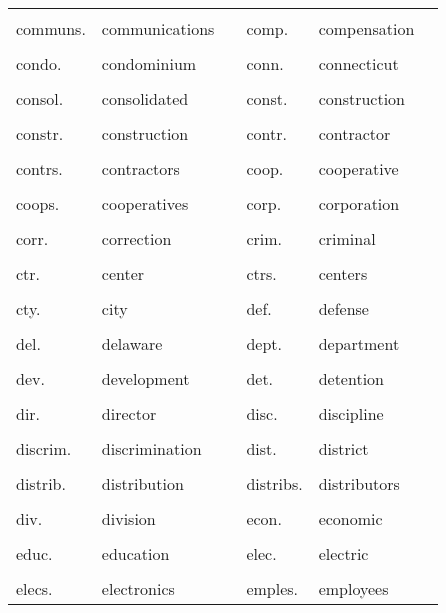 \documentclass[10pt, letterpaper]{article}
\begin{document}
\begin{spacing}{1.0}
\begin{footnotesize}
\begin{longtable}[H]{p{1in}>{\raggedright}p{2in} p{0.2in} p{1in}>{\raggedright}p{2in} p{0in}}
    &  &  &  &  & \\[-6pt]
    communs. & communications & & comp. & compensation &\\
    &  &  &  &  & \\[-6pt]
    condo. & condominium & & conn. & connecticut &\\
    &  &  &  &  & \\[-6pt]
    consol. & consolidated & & const. & construction &\\
    &  &  &  &  & \\[-6pt]
    constr. & construction & & contr. & contractor &\\
    &  &  &  &  & \\[-6pt]
    contrs. & contractors & & coop. & cooperative &\\
    &  &  &  &  & \\[-6pt]
    coops. & cooperatives & & corp. & corporation &\\
    &  &  &  &  & \\[-6pt]
    corr. & correction & & crim. & criminal &\\
    &  &  &  &  & \\[-6pt]
    ctr. & center & & ctrs. & centers &\\
    &  &  &  &  & \\[-6pt]
    cty. & city & & def. & defense &\\
    &  &  &  &  & \\[-6pt]
    del. & delaware & & dept. & department &\\
    &  &  &  &  & \\[-6pt]
    dev. & development & & det. & detention &\\
    &  &  &  &  & \\[-6pt]
    dir. & director & & disc. & discipline &\\
    &  &  &  &  & \\[-6pt]
    discrim. & discrimination & & dist. & district &\\
    &  &  &  &  & \\[-6pt]
    distrib. & distribution & & distribs. & distributors &\\
    &  &  &  &  & \\[-6pt]
    div. & division & & econ. & economic &\\
    &  &  &  &  & \\[-6pt]
    educ. & education & & elec. & electric &\\
    &  &  &  &  & \\[-6pt]
    elecs. & electronics & & emples. & employees &\\

\end{longtable}
\end{footnotesize}
\end{spacing}
\end{document}
